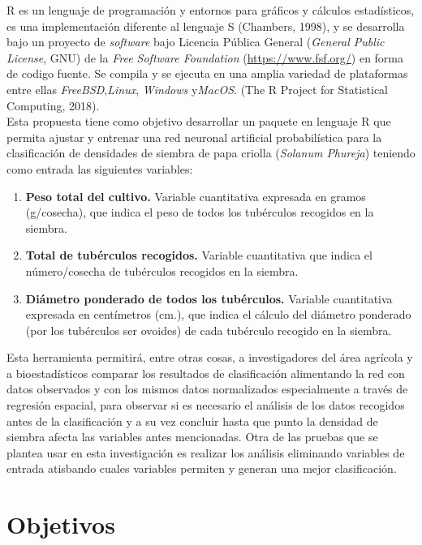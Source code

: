 R es un lenguaje de programación y entornos para gráficos y c\'alculos estad\'isticos, es una implementación diferente al lenguaje S (Chambers, 1998), y se desarrolla bajo un proyecto de \textit{software} bajo Licencia Pública General (\textit{General Public License}, GNU) de la \textit{Free Software Foundation} (\url{https://www.fsf.org/}) en forma de codigo fuente. Se compila y se ejecuta en una amplia variedad de plataformas entre ellas \textit{FreeBSD},\textit{Linux}, \textit{Windows} y\textit{MacOS}. (The R Project for Statistical Computing, 2018).\\


Esta propuesta tiene como objetivo desarrollar un paquete en lenguaje R que permita ajustar y entrenar una red neuronal artificial probabil\'istica para la clasificación de densidades de siembra de papa criolla (\textit{Solanum Phureja}) teniendo como entrada las siguientes variables: 

\begin{enumerate}
    \item{\textbf{Peso total del cultivo.} Variable cuantitativa expresada en gramos (g/cosecha), que indica el peso de todos los tubérculos recogidos en la siembra.}
	\item{\textbf{Total de tubérculos recogidos.} Variable cuantitativa que indica el número/cosecha de tubérculos recogidos en la siembra.}
	\item{\textbf{Diámetro ponderado de todos los tubérculos.} Variable cuantitativa expresada en centímetros (cm.), que indica el c\'alculo del diámetro ponderado (por los tubérculos ser ovoides) de cada tubérculo recogido en la siembra.}
\end{enumerate}


Esta herramienta permitirá, entre otras cosas, a investigadores del área agrícola y a bioestadísticos comparar los resultados de clasificación alimentando la red con datos observados y con los mismos datos normalizados especialmente a través de regresión espacial, para observar si es necesario el análisis de los datos recogidos antes de la clasificación y a su vez concluir hasta que punto la densidad de siembra afecta las variables antes mencionadas. Otra de las pruebas que se plantea usar en esta investigación es realizar los análisis eliminando variables de entrada atisbando cuales variables permiten y generan una mejor clasificación.\\

\section{Objetivos}

